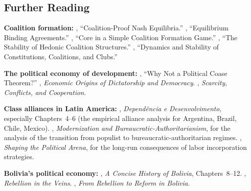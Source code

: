 \documentclass[../structural_economics_book.tex]{subfiles}
\begin{document}
\subsection*{Further Reading}

\textbf{Coalition formation:} \citet{bernheim1987coalition}, ``Coalition-Proof Nash Equilibria.'' \citet{ray1997equilibrium}, ``Equilibrium Binding Agreements.'' \citet{banerjee2001core}, ``Core in a Simple Coalition Formation Game.'' \citet{bogomolnaia2002stability}, ``The Stability of Hedonic Coalition Structures.'' \citet{acemoglu2012dynamics}, ``Dynamics and Stability of Constitutions, Coalitions, and Clubs.''

\textbf{The political economy of development:} \citet{acemoglu2003why}, ``Why Not a Political Coase Theorem?'' \citet{acemoglu2006economic}, \textit{Economic Origins of Dictatorship and Democracy}. \citet{bardhan2005scarcity}, \textit{Scarcity, Conflicts, and Cooperation}.

\textbf{Class alliances in Latin America:} \citet{cardoso1969dependencia}, \textit{Depend\^{e}ncia e Desenvolvimento}, especially Chapters~4--6 (the empirical alliance analysis for Argentina, Brazil, Chile, Mexico). \citet{odonnell1973modernization}, \textit{Modernization and Bureaucratic-Authoritarianism}, for the analysis of the transition from populist to bureaucratic-authoritarian regimes. \citet{collier1991shaping}, \textit{Shaping the Political Arena}, for the long-run consequences of labor incorporation strategies.

\textbf{Bolivia's political economy:} \citet{klein2011concise}, \textit{A Concise History of Bolivia}, Chapters~8--12. \citet{dunkerley1984rebellion}, \textit{Rebellion in the Veins}. \citet{webber2011rebellion}, \textit{From Rebellion to Reform in Bolivia}.
\end{document}
